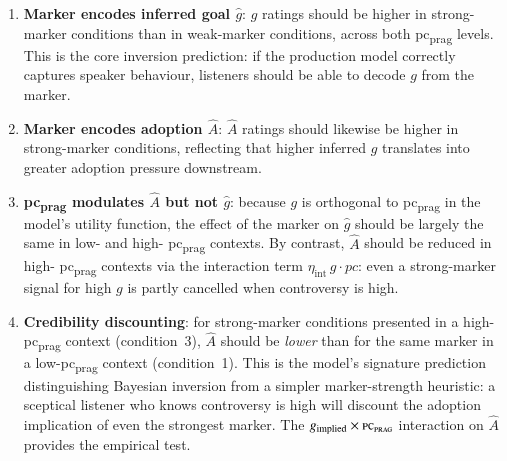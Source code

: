 \documentclass[12pt]{article}
\begin{document}
\begin{enumerate}
  \item \textbf{Marker encodes inferred goal $\widehat{g}$}: $\widehat{g}$
        ratings should be higher in strong-marker conditions than in
        weak-marker conditions, across both pc\textsubscript{prag} levels.
        This is the core inversion prediction: if the production model
        correctly captures speaker behaviour, listeners should be able to
        decode $g$ from the marker.

  \item \textbf{Marker encodes adoption $\widehat{A}$}: $\widehat{A}$
        ratings should likewise be higher in strong-marker conditions,
        reflecting that higher inferred $g$ translates into greater
        adoption pressure downstream.

  \item \textbf{pc\textsubscript{prag} modulates $\widehat{A}$ but not
        $\widehat{g}$}: because $g$ is orthogonal to pc\textsubscript{prag}
        in the model's utility function, the effect of the marker on
        $\widehat{g}$ should be largely the same in low- and high-
        pc\textsubscript{prag} contexts.
        By contrast, $\widehat{A}$ should be reduced in high-
        pc\textsubscript{prag} contexts via the interaction term
        $\eta_{\mathrm{int}}\,g \cdot pc$: even a strong-marker signal
        for high $g$ is partly cancelled when controversy is high.

  \item \textbf{Credibility discounting}: for strong-marker conditions
        presented in a high-pc\textsubscript{prag} context (condition~3),
        $\widehat{A}$ should be \emph{lower} than for the same marker in
        a low-pc\textsubscript{prag} context (condition~1).
        This is the model's signature prediction distinguishing Bayesian
        inversion from a simpler marker-strength heuristic: a sceptical
        listener who knows controversy is high will discount the adoption
        implication of even the strongest marker.
        The $g_{\mathrm{implied}} \times \textsc{pc\textsubscript{prag}}$
        interaction on $\widehat{A}$ provides the empirical test.
\end{enumerate}
\end{document}
